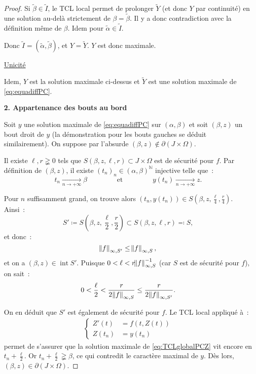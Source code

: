\documentclass{report}
\theoremstyle{definition}
\theoremstyle{remark}
\numberwithin{equation}{section}
\newcommand{\N}{\mathbb N}
\DeclareMathOperator{\intr}{int}
\newcommand{\pinfty}{{+\infty}}
\begin{document}
\begin{proof}
					Si $\widetilde \beta \in \widetilde I$, le TCL local permet de prolonger $\widetilde Y$ (et donc $Y$ par continuité) en une solution
					au-delà strictement de $\beta = \widetilde \beta$. Il y a donc contradiction avec la définition même de $\beta$. Idem pour
					$\widetilde \alpha \in \widetilde I$.

					Donc $\widetilde I = (\widetilde \alpha, \widetilde \beta)$, et $Y = \widetilde Y$. $Y$ est donc maximale.

				\underline{Unicité}

					Idem, $Y$ est la solution maximale ci-dessus et $\widetilde Y$ est une solution maximale de \eqref{eq:equadiffPC}.  %

			\textbf{2. Appartenance des bouts au bord}

				Soit $y$ une solution maximale de \eqref{eq:equadiffPC} sur $(\alpha, \beta)$ et soit $(\beta, z)$ un bout droit de $y$ (la démonstration pour
				les bouts gauches se déduit similairement). On suppose par l'absurde $(\beta, z) \not \in \partial(J \times \Omega)$.

				Il existe $\ell, r \gneqq 0$ tels que $S(\beta, z, \ell, r) \subset J \times \Omega$ est de sécurité pour $f$. Par définition de $(\beta, z)$,
				il existe $(t_n)_n \in (\alpha, \beta)^\N$ injective telle que~:
				\begin{equation}
					t_n \xrightarrow[n \to \pinfty]{} \beta \qquad\qquad \text{ et } \qquad\qquad y(t_n) \xrightarrow[n \to \pinfty]{} z.
				\end{equation}

				Pour $n$ suffisamment grand, on trouve alors $(t_n, y(t_n)) \in S\left(\beta, z, \frac \ell4, \frac r4\right)$. Ainsi~:
				\begin{equation}
					S' \coloneqq S\left(\beta, z, \frac \ell2, \frac r2\right) \subset S(\beta, z, \ell, r) \eqqcolon S,
				\end{equation}
				et donc~:
				\begin{equation}
					\norm f_{\infty, S'} \leq \norm f_{\infty, S},
				\end{equation}
				et on a $(\beta, z) \in \intr S'$. Puisque $0 < \ell < r{\norm f_{\infty, S}^{-1}}$ (car $S$ est de sécurité pour $f$), on sait~:
				\begin{equation}
					0 < \frac \ell2 < \frac r{2\norm f_{\infty, S}} \leq \frac r{2\norm f_{\infty, S'}}.
				\end{equation}

				On en déduit que $S'$ est également de sécurité pour $f$. Le TCL local appliqué à~:
				\begin{align}\label{eq:TCLglobalPCZ}
					\begin{cases}
						Z'(t) &= f(t, Z(t)) \\
						Z(t_n) &= y(t_n)
					\end{cases}
				\end{align}
				permet de s'assurer que la solution maximale de \eqref{eq:TCLglobalPCZ} vit encore en $t_n + \frac \ell2$. Or $t_n + \frac \ell2 \gneqq \beta$,
				ce qui contredit le caractère maximal de $y$. Dès lors, $(\beta, z) \in \partial(J \times \Omega)$.
			\end{proof}
\end{document}
